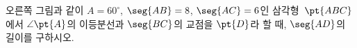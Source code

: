 \noindent\begin{minipage}[t]{0.58\linewidth}\vspace{0pt}\raggedright 오른쪽 그림과 같이 $A=60^\circ$, $\seg{AB}=8$, $\seg{AC}=6$인 삼각형~$\pt{ABC}$에서 $\angle\pt{A}$의 이등분선과 $\seg{BC}$의 교점을 $\pt{D}$라 할 때, $\seg{AD}$의 길이를 구하시오.\end{minipage}\hfill\begin{minipage}[t]{0.4\linewidth}\vspace{0pt}\centering \resizebox{\ifdim\width>\linewidth\linewidth\else\width\fi}{!}{}\end{minipage}\par
